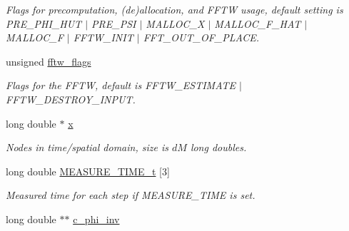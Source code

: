 \begin{DoxyCompactItemize}
\begin{DoxyCompactList}\small\item\em Flags for precomputation, (de)allocation, and F\-F\-T\-W usage, default setting is P\-R\-E\-\_\-\-P\-H\-I\-\_\-\-H\-U\-T $\vert$ P\-R\-E\-\_\-\-P\-S\-I $\vert$ M\-A\-L\-L\-O\-C\-\_\-\-X $\vert$ M\-A\-L\-L\-O\-C\-\_\-\-F\-\_\-\-H\-A\-T $\vert$ M\-A\-L\-L\-O\-C\-\_\-\-F $\vert$ F\-F\-T\-W\-\_\-\-I\-N\-I\-T $\vert$ F\-F\-T\-\_\-\-O\-U\-T\-\_\-\-O\-F\-\_\-\-P\-L\-A\-C\-E. \end{DoxyCompactList}\item 
\hypertarget{structnfftl__plan_a4e0df1f491a4aa8f7373d776d705095f}{unsigned \hyperlink{structnfftl__plan_a4e0df1f491a4aa8f7373d776d705095f}{fftw\-\_\-flags}}\label{structnfftl__plan_a4e0df1f491a4aa8f7373d776d705095f}

\begin{DoxyCompactList}\small\item\em Flags for the F\-F\-T\-W, default is F\-F\-T\-W\-\_\-\-E\-S\-T\-I\-M\-A\-T\-E $\vert$ F\-F\-T\-W\-\_\-\-D\-E\-S\-T\-R\-O\-Y\-\_\-\-I\-N\-P\-U\-T. \end{DoxyCompactList}\item 
\hypertarget{structnfftl__plan_ad5695c30a05c03573082a1aac0394700}{long double $\ast$ \hyperlink{structnfftl__plan_ad5695c30a05c03573082a1aac0394700}{x}}\label{structnfftl__plan_ad5695c30a05c03573082a1aac0394700}

\begin{DoxyCompactList}\small\item\em Nodes in time/spatial domain, size is $dM$ long doubles. \end{DoxyCompactList}\item 
\hypertarget{structnfftl__plan_ab028b535d709aff32583f969b53d1760}{long double \hyperlink{structnfftl__plan_ab028b535d709aff32583f969b53d1760}{M\-E\-A\-S\-U\-R\-E\-\_\-\-T\-I\-M\-E\-\_\-t} \mbox{[}3\mbox{]}}\label{structnfftl__plan_ab028b535d709aff32583f969b53d1760}

\begin{DoxyCompactList}\small\item\em Measured time for each step if M\-E\-A\-S\-U\-R\-E\-\_\-\-T\-I\-M\-E is set. \end{DoxyCompactList}\item 
\hypertarget{structnfftl__plan_afdcd5a1259a4fb7e7271efe30a207265}{long double $\ast$$\ast$ \hyperlink{structnfftl__plan_afdcd5a1259a4fb7e7271efe30a207265}{c\-\_\-phi\-\_\-inv}}\label{structnfftl__plan_afdcd5a1259a4fb7e7271efe30a207265}


\end{DoxyCompactItemize}
